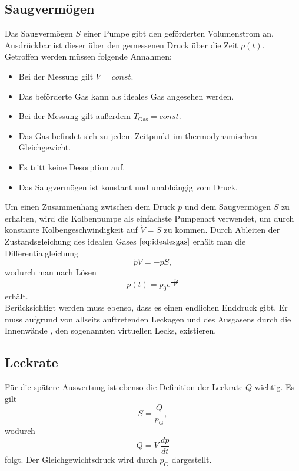 \subsection{Saugvermögen}
Das Saugvermögen $S$ einer Pumpe gibt den geförderten Volumenstrom an.
Ausdrückbar ist dieser über den gemessenen Druck über die Zeit $p(t)$.\\
Getroffen werden müssen folgende Annahmen:
\begin{itemize}
  \item Bei der Messung gilt $V=const$.
  \item Das beförderte Gas kann als ideales Gas angesehen werden.
  \item Bei der Messung gilt außerdem $T_\text{Gas}=const$.
  \item Das Gas befindet sich zu jedem Zeitpunkt im thermodynamischen Gleichgewicht.
  \item Es tritt keine Desorption auf.
  \item Das Saugvermögen ist konstant und unabhängig vom Druck.
\end{itemize}
Um einen Zusammenhang zwischen dem Druck $p$ und dem Saugvermögen $S$ zu erhalten, wird die Kolbenpumpe als einfachste Pumpenart verwendet,
um durch konstante Kolbengeschwindigkeit auf $\dot{V}=S$ zu kommen.
Durch Ableiten der Zustandsgleichung des idealen Gases $\ref{eq:idealesgas}$ erhält man die Differentialgleichung
\begin{equation}
  \dot{p}V=-pS,
\end{equation}
wodurch man nach Lösen
\begin{equation}
  p(t)=p_0 e^{\frac{-tS}{V}}
\end{equation}
erhält.\\
Berücksichtigt werden muss ebenso, dass es einen endlichen Enddruck gibt.
Er muss aufgrund von allseits auftretenden Leckagen und des Ausgasens durch die Innenwände , den sogenannten virtuellen Lecks, existieren.
\subsection{Leckrate}
Für die spätere Auswertung ist ebenso die Definition der Leckrate $Q$ wichtig. Es gilt
\begin{equation}
  S=\frac{Q}{p_\text{G}},
  \label{eq:leckrate1}
\end{equation}
wodurch
\begin{equation}
  Q=V \, \frac{dp}{dt}
  \label{eq:leckrate2}
\end{equation}
folgt.
Der Gleichgewichtsdruck wird durch $p_G$ dargestellt.
